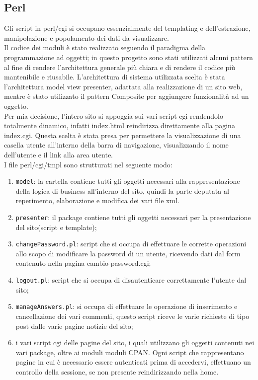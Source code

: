 \subsection{Perl}

Gli script in perl/cgi si occupano essenzialmente del templating e dell'estrazione, manipolazione e popolamento dei dati da visualizzare.\\
Il codice dei moduli è stato realizzato seguendo il paradigma della programmazione ad oggetti; in questo progetto sono stati utilizzati alcuni pattern al fine di rendere l'architettura generale più chiara e di rendere il codice più mantenibile e riusabile. L'architettura di sistema utilizzata scelta è stata l'architettura model view presenter, adattata alla realizzazione di un sito web, mentre è stato utilizzato il pattern Composite per aggiungere funzionalità ad un oggetto.\\
Per mia decisione, l'intero sito si appoggia sui vari script cgi rendendolo totalmente dinamico, infatti index.html reindirizza direttamente alla pagina index.cgi.
Questa scelta è stata presa per permettere la visualizzazione di una casella utente all'interno della barra di navigazione, visualizzando il nome dell'utente e il link alla area utente.\\

I file perl/cgi/tmpl sono strutturati nel seguente modo:

\begin{enumerate}
  \item \texttt{model}: la cartella contiene tutti gli oggetti necessari alla rappresentazione della logica di business all'interno del sito, quindi la parte deputata al reperimento, elaborazione e modifica dei vari file xml.
  \item \texttt{presenter}: il package contiene tutti gli oggetti necessari per la presentazione del sito(script e template);
  \item \texttt{changePassword.pl}: script che si occupa di effettuare le corrette operazioni allo scopo di modificare la password di un utente, ricevendo dati dal form contenuto nella pagina cambio-password.cgi;
  \item \texttt{logout.pl}: script  che si occupa di disautenticare correttamente l'utente dal sito;
  \item \texttt{manageAnswers.pl}: si occupa di effettuare le operazione di inserimento e cancellazione dei vari commenti, questo script riceve le varie richieste di tipo post dalle varie pagine notizie del sito;
  \item i vari script cgi delle pagine del sito, i quali utilizzano gli oggetti contenuti nei vari package, oltre ai moduli moduli CPAN. Ogni script che rappresentano pagine in cui è necessario essere autenticati prima di accedervi, effettuano un controllo della sessione, se non presente reindirizzando nella home.
\end{enumerate}

